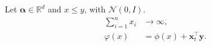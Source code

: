 \documentclass{article}
\begin{document}
Let $\boldsymbol{\alpha} \in \mathbb{R}^d$ and $x \leq y$, with $\mathcal{N}(0, I)$.
\begin{align}
  \sum_{i=1}^{n} x_i &\to \infty, \\
  \varphi(x) &= \phi(x) + \mathbf{x}_t^\top \mathbf{y}.
\end{align}
\end{document}
